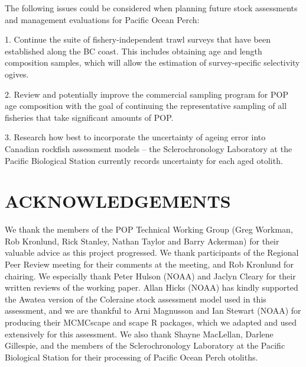 The following issues could be considered when planning future stock assessments and management evaluations for Pacific Ocean Perch:

1. Continue the suite of fishery-independent trawl surveys that have been established along the BC coast. This includes obtaining age and length composition samples, which will allow the estimation of survey-specific selectivity ogives. 

2. Review and potentially improve the commercial sampling program for POP age composition with the goal of continuing the representative sampling of all fisheries that take significant amounts of POP.

3. Research how best to incorporate the uncertainty of ageing error into Canadian rockfish assessment models --  the Sclerochronology Laboratory at the Pacific Biological Station currently records uncertainty for each aged otolith.


\section{ACKNOWLEDGEMENTS}

We thank the members of the POP Technical Working Group (Greg Workman, Rob Kronlund, Rick Stanley, Nathan Taylor and Barry Ackerman) for their valuable advice as this project progressed. We thank participants of the Regional Peer Review meeting for their comments at the meeting, and Rob Kronlund for chairing. We especially thank Peter Hulson (NOAA) and Jaclyn Cleary for their written reviews of the working paper. Allan Hicks (NOAA) has kindly supported the Awatea version of the Coleraine stock assessment model used in this assessment, and we are thankful to Arni Magnusson and Ian Stewart (NOAA) for producing their MCMCscape and scape R packages, which we adapted and used extensively for this assessment. We also thank Shayne MacLellan, Darlene Gillespie, and the members of the Sclerochronology Laboratory at the Pacific Biological Station for their processing of Pacific Ocean Perch otoliths. 


  



